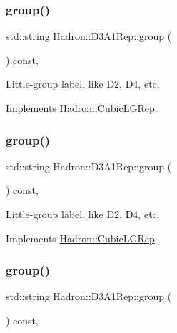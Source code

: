 \subsubsection{\texorpdfstring{group()}{group()}\hspace{0.1cm}{\footnotesize\ttfamily [3/5]}}
{\footnotesize\ttfamily std\+::string Hadron\+::\+D3\+A1\+Rep\+::group (\begin{DoxyParamCaption}{ }\end{DoxyParamCaption}) const\hspace{0.3cm}{\ttfamily [inline]}, {\ttfamily [virtual]}}

Little-\/group label, like D2, D4, etc. 

Implements \mbox{\hyperlink{structHadron_1_1CubicLGRep_a9bdb14b519a611d21379ed96a3a9eb41}{Hadron\+::\+Cubic\+L\+G\+Rep}}.

\mbox{\label{structHadron_1_1D3A1Rep_a03d8ecc85c64ea7c17e55196d73174f4}} 
\subsubsection{\texorpdfstring{group()}{group()}\hspace{0.1cm}{\footnotesize\ttfamily [4/5]}}
{\footnotesize\ttfamily std\+::string Hadron\+::\+D3\+A1\+Rep\+::group (\begin{DoxyParamCaption}{ }\end{DoxyParamCaption}) const\hspace{0.3cm}{\ttfamily [inline]}, {\ttfamily [virtual]}}

Little-\/group label, like D2, D4, etc. 

Implements \mbox{\hyperlink{structHadron_1_1CubicLGRep_a9bdb14b519a611d21379ed96a3a9eb41}{Hadron\+::\+Cubic\+L\+G\+Rep}}.

\mbox{\label{structHadron_1_1D3A1Rep_a03d8ecc85c64ea7c17e55196d73174f4}} 
\subsubsection{\texorpdfstring{group()}{group()}\hspace{0.1cm}{\footnotesize\ttfamily [5/5]}}
{\footnotesize\ttfamily std\+::string Hadron\+::\+D3\+A1\+Rep\+::group (\begin{DoxyParamCaption}{ }\end{DoxyParamCaption}) const\hspace{0.3cm}{\ttfamily [inline]}, {\ttfamily [virtual]}}

